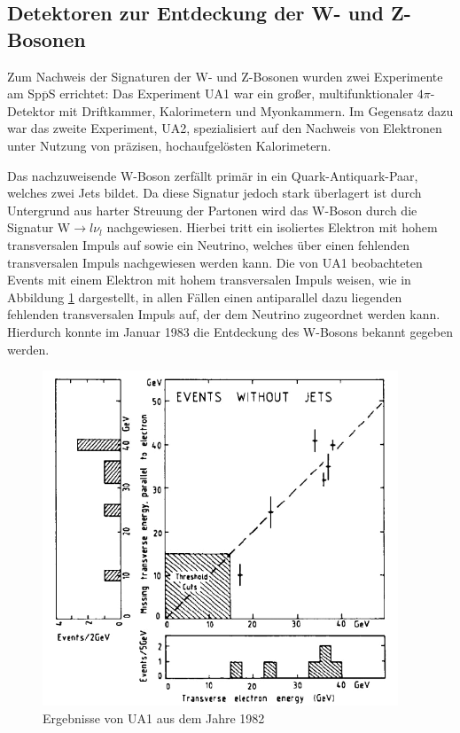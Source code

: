 \subsection{Detektoren zur Entdeckung der W- und Z-Bosonen}

Zum Nachweis der Signaturen der W- und Z-Bosonen wurden zwei Experimente am Sp$\overline{\text{p}}$S errichtet:
Das Experiment UA1 war ein großer, multifunktionaler $4\pi$-Detektor mit Driftkammer, Kalorimetern und Myonkammern.
Im Gegensatz dazu war das zweite Experiment, UA2, spezialisiert auf den Nachweis von Elektronen unter Nutzung von präzisen, hochaufgelösten Kalorimetern.

Das nachzuweisende W-Boson zerfällt primär in ein Quark-Antiquark-Paar, welches zwei Jets bildet.
Da diese Signatur jedoch stark überlagert ist durch Untergrund aus harter Streuung der Partonen wird das W-Boson durch die Signatur $\text{W} \rightarrow l \nu_l$ nachgewiesen.
Hierbei tritt ein isoliertes Elektron mit hohem transversalen Impuls auf sowie ein Neutrino, welches über einen fehlenden transversalen Impuls nachgewiesen werden kann.
Die von UA1 beobachteten Events mit einem Elektron mit hohem transversalen Impuls weisen, wie in Abbildung \ref{fig:boson} dargestellt, in allen Fällen einen antiparallel dazu liegenden fehlenden transversalen Impuls auf, der dem Neutrino zugeordnet werden kann.
Hierdurch konnte im Januar 1983 die Entdeckung des W-Bosons bekannt gegeben werden.

\begin{figure}
  \centering
  \includegraphics[height=10.0cm]{ressources/Screenshot_2018-12-04_18-22-25.png}
  \caption{Ergebnisse von UA1 aus dem Jahre 1982 \cite{boson}}
  \label{fig:boson}
\end{figure}

